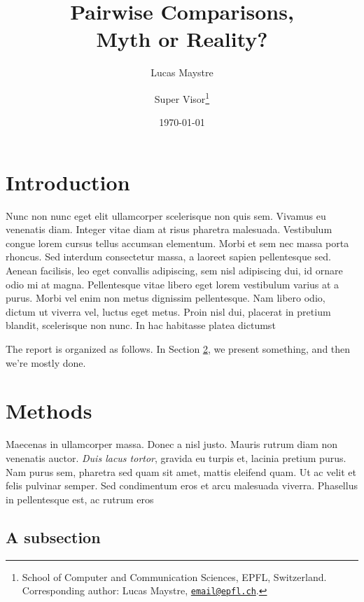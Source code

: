 \documentclass[12pt,paper=a4,pagesize,abstracton]{scrartcl}
\title{Pairwise Comparisons,\\Myth or Reality?}
\author{Lucas Maystre \and Super Visor\thanks{School of Computer and
Communication Sciences, EPFL, Switzerland. Corresponding author: Lucas Maystre,
\href{mailto:email@epfl.ch}{\nolinkurl{email@epfl.ch}}.}}
\date{\today}
\begin{document}
\maketitle



\section{Introduction} %
\label{sec:intro}

Nunc non nunc eget elit ullamcorper scelerisque non quis sem. Vivamus eu
venenatis diam. Integer vitae diam at risus pharetra malesuada. Vestibulum
congue lorem cursus tellus accumsan elementum. Morbi et sem nec massa porta
rhoncus. Sed interdum \citep{lecun2004learning} consectetur massa, a laoreet
sapien pellentesque sed.  Aenean facilisis, leo eget convallis adipiscing, sem
nisl adipiscing dui, id ornare odio mi at magna. Pellentesque vitae libero eget
lorem vestibulum varius at a purus. Morbi vel enim non metus dignissim
pellentesque. Nam libero odio, dictum ut viverra vel, luctus eget metus. Proin
nisl dui, placerat in pretium blandit, scelerisque non nunc. In hac habitasse
platea dictumst

The report is organized as follows. In Section \ref{sec:methods}, we present
something, and then we're mostly done.


\section{Methods} %
\label{sec:methods}

Maecenas in ullamcorper massa. Donec a nisl justo. Mauris rutrum diam non
venenatis auctor. \emph{Duis lacus tortor}, gravida eu turpis et, lacinia
pretium purus. Nam purus sem, pharetra sed quam sit amet, mattis eleifend quam.
Ut ac velit et felis pulvinar semper. Sed condimentum eros et arcu malesuada
viverra.  Phasellus in pellentesque est, ac rutrum eros

\subsection{A subsection}
\end{document}

